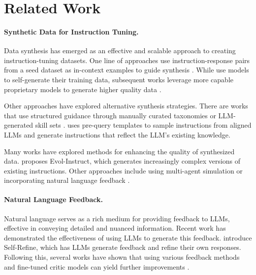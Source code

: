 \section{Related Work}

\paragraph{Synthetic Data for Instruction Tuning.}

Data synthesis has emerged as an effective and scalable approach to creating instruction-tuning datasets. One line of approaches use instruction-response pairs from a seed dataset as in-context examples to guide synthesis \citep{wang-etal-2023-self-instruct, alpaca, peng2023instructiontuninggpt4}. While \citet{wang-etal-2023-self-instruct} use models to self-generate their training data, subsequent works leverage more capable proprietary models to generate higher quality data \citep{alpaca, peng2023instructiontuninggpt4}.

Other approaches have explored alternative synthesis strategies. There are works that use structured guidance through manually curated taxonomies or LLM-generated skill sets \citep{li2024syntheticdataalmostscratch, kaur2024instruct}. \citet{xu2024magpiealignmentdatasynthesis} uses pre-query templates to sample instructions from aligned LLMs and generate instructions that reflect the LLM's existing knowledge.

Many works have explored methods for enhancing the quality of synthesized data. \citet{xu2023wizardlmempoweringlargelanguage} proposes Evol-Instruct, which generates increasingly complex versions of existing instructions. Other approaches include using multi-agent simulation \citep{tang2024synthesizingposttrainingdatallms} or incorporating natural language feedback \citep{bai2022constitutionalaiharmlessnessai, chen2024learning, NEURIPS2023_0764db11}.


\paragraph{Natural Language Feedback.}

Natural language serves as a rich medium for providing feedback to LLMs, effective in conveying detailed and nuanced information. Recent work has demonstrated the effectiveness of using LLMs to generate this feedback. \citet{NEURIPS2023_91edff07} introduce Self-Refine, which has LLMs generate feedback and refine their own responses. Following this, several works have shown that using various feedback methods and fine-tuned critic models can yield further improvements \citep{jin2023dataefficient, wang2023shepherdcriticlanguagemodel, gou2024criticlargelanguagemodels, wu2024meta}.

